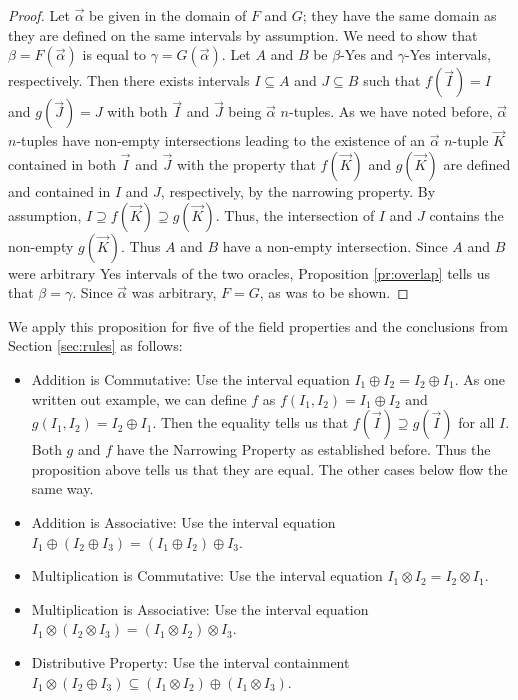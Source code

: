 \documentclass[12pt]{article}
\begin{document}
\begin{proof}
Let $\vec{\alpha}$ be given in the domain of $F$ and $G$; they have the same domain as they are defined on the same intervals by assumption. We need to show that $\beta = F(\vec{\alpha})$ is equal to $\gamma =  G(\vec{\alpha})$. Let $A$ and $B$ be $\beta$-Yes and $\gamma$-Yes intervals, respectively. Then there exists intervals $I \subseteq A$ and  $J \subseteq B$  such that $f(\vec{I}) = I$ and $g(\vec{J}) = J$ with both  $\vec{I}$ and $\vec{J}$ being $\vec{\alpha}$ $n$-tuples. As we have noted before, $\vec{\alpha}$ $n$-tuples have non-empty intersections leading to the existence of an $\vec{\alpha}$ $n$-tuple $\vec{K}$ contained in both $\vec{I}$ and $\vec{J}$ with the property that $f(\vec{K})$ and $g(\vec{K})$ are defined and contained in $I$ and $J$, respectively, by the narrowing property. By assumption, $I \supseteq f(\vec{K}) \supseteq g(\vec{K})$. Thus, the intersection of $I$ and $J$ contains the non-empty $g(\vec{K})$. Thus $A$ and $B$ have a non-empty intersection. Since $A$ and $B$ were arbitrary Yes intervals of the two oracles, Proposition \ref{pr:overlap} tells us that $\beta = \gamma$. Since $\vec{\alpha}$ was arbitrary, $F = G$, as was to be shown.
\end{proof}

We apply this proposition for five of the field properties and the conclusions from Section \ref{sec:rules} as follows: 

\begin{itemize}
    \item Addition is Commutative:  Use the interval equation $I_1 \oplus I_2 = I_2 \oplus I_1$. As one written out example, we can define $f$ as $f(I_1, I_2) = I_1 \oplus I_2$ and $g(I_1, I_2) = I_2 \oplus I_1$. Then the equality tells us that $f(\vec{I}) \supseteq g(\vec{I})$ for all $I$. Both $g$ and $f$ have the Narrowing Property as established before. Thus the proposition above tells us that they are equal. The other cases below flow the same way. 
    \item Addition is Associative: Use the interval equation $I_1 \oplus (I_2 \oplus I_3) = (I_1 \oplus I_2) \oplus I_3$.
    \item Multiplication is Commutative: Use the interval equation $I_1 \otimes I_2 = I_2 \otimes I_1$.
    \item Multiplication is Associative: Use the interval equation $I_1 \otimes (I_2 \otimes I_3) = (I_1 \otimes I_2) \otimes I_3$.
    \item Distributive Property: Use the interval containment $I_1 \otimes (I_2 \oplus I_3) \subseteq (I_1 \otimes I_2) \oplus (I_1 \otimes I_3)$.
\end{itemize}
\end{document}
